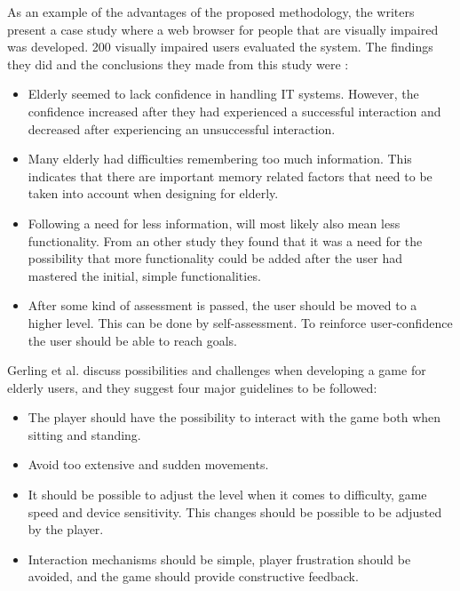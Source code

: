 As an example of the advantages of the proposed methodology, the writers present a case study where a web browser for people that are visually impaired was developed. 200 visually impaired users evaluated the system. The findings they did and the conclusions they made from this study were \cite{gregor}: 
\begin{itemize}
\item Elderly seemed to lack confidence in handling IT systems. However, the confidence increased after they had experienced a successful interaction and decreased after experiencing an unsuccessful interaction.
\item Many elderly had difficulties remembering too much information. This indicates that there are important memory related factors that need to be taken into account when designing for elderly. 
\item Following a need for less information, will most likely also mean less functionality. From an other study they found that it was a need for the possibility that more functionality could be added after the user had mastered the initial, simple functionalities.
\item After some kind of assessment is passed, the user should be moved to a higher level. This can be done by self-assessment. To reinforce user-confidence the user should be able to reach goals. 
\end{itemize}

Gerling et al. \cite{gerling1} discuss possibilities and challenges when developing a game for elderly users, and they suggest four major guidelines to be followed:
\begin{itemize}
\item The player should have the possibility to interact with the game both when sitting and standing. 
\item Avoid too extensive and sudden movements.
\item It should be possible to adjust the level when it comes to difficulty, game speed and device sensitivity. This changes should be possible to be adjusted by the player. 
\item Interaction mechanisms should be simple, player frustration should be avoided, and the game should provide constructive feedback.
\end{itemize}

